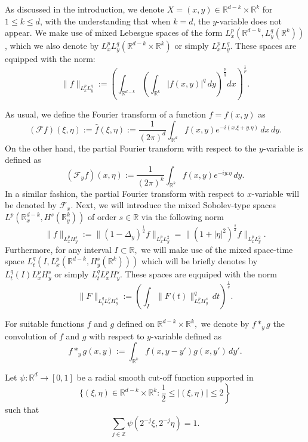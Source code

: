 \documentclass[a4paper,11pt, reqno]{amsart}
\theoremstyle{definition}
\theoremstyle{remark}
\numberwithin{equation}{section}
\newcommand{\R}{\mathbb R}
\begin{document}
As discussed in the introduction, we denote \( X = (x, y) \in \mathbb{R}^{d-k} \times \mathbb{R}^k \) for \( 1 \leq k \leq d \), with the understanding that when \( k = d \), the \( y \)-variable does not appear. We make use of mixed Lebesgue spaces of the form \( L^p_x(\mathbb{R}^{d-k}, L^q_y(\mathbb{R}^k)) \), which we also denote by \( L^p_xL^q_y(\mathbb{R}^{d-k} \times \mathbb{R}^k) \) or simply \( L^p_xL^q_y \). These spaces are equipped with the norm:
$$ \|f\|_{L^p_xL^q_y} := \left( \int_{\mathbb{R}^{d-k}} \left( \int_{\mathbb{R}^k}  |f(x, y)|^q\, dy \right)^{\frac{p}{q}} dx \right)^{\frac{1}{p}}.$$


As usual, we define the Fourier transform of a function $f=f(x, y)$ as 
$$(\mathcal{F}f)(\xi, \eta):= \widehat{f}(\xi, \eta):= \frac{1}{(2\pi)^d} \int_{\mathbb{R}^d}f(x, y) e^{-i (x. \xi+y.\eta)}\,dx\,dy.$$
On the other hand, the partial Fourier transform with respect to the $y$-variable is defined as 
$$(\mathcal{F}_yf)(x, \eta) :=\frac{1}{(2\pi)^k} \int_{\mathbb{R}^k}f(x, y) e^{-i y.\eta}\,dy. $$
In a similar fashion, the partial Fourier transform with respect to $x$-variable will be denoted by $\mathcal{F}_x.$
Next, we will introduce the mixed Sobolev-type spaces $L^p(\mathbb{R}_x^{d-k}, H^s(\mathbb{R}^{k}_y))$ of order $s \in \mathbb{R}$ via the following norm
$$\|f\|_{L^p_xH^s_y}:= \|(1-\Delta_y)^{\frac{1}{2}} f\|_{L^p_xL^2_y}= \|(1+|\eta|^2)^{\frac{s}{2}} f\|_{L^p_xL^2_y}. $$
    Furthermore, for any interval $I \subset \mathbb{R},$ we will make use of the mixed space-time space $L^q_t(I, L^p_x(\mathbb{R}^{d-k}, H^s_y(\mathbb{R}^{k})))$ which will be briefly denotes by $ L^q_t(I)L^p_xH_y^s$ or simply $L^q_tL^p_xH_y^s.$ These spaces are eqquiped with the norm 
$$\|F\|_{L^q_tL^p_xH_y^s}:= \left( \int_I \|F(t)\|^q_{L^p_xH^s_y}\, dt \right)^{\frac{1}{q}}.$$

    For suitable functions $f$ and $g$ defined on $\R^{d-k} \times \R^k,$ we denote by $f*_y g$ the convolution of $f$ and $g$ with respect to $y$-variable defined as 
$$f*_yg (x, y):= \int_{\R^k} f(x, y-y') g(x, y')\, dy'. $$

	Let $\psi: \mathbb{R}^{d} \rightarrow[0,1]$ be a radial smooth cut-off function supported in $$\{(\xi, \eta) \in\left.\mathbb{R}^{d-k} \times \mathbb{R}^k: \frac{1}{2} \leq|(\xi, \eta)| \leq 2\right\}$$ such that
	$$
	\sum_{j \in \mathbb{Z}} \psi\left(2^{-j} \xi, 2^{-j} \eta\right)=1.
	$$
	
\end{document}
